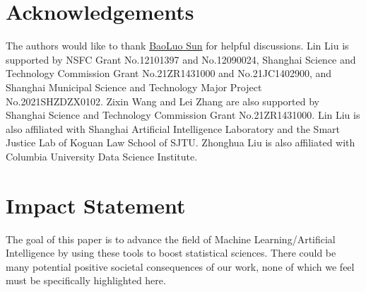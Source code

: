\documentclass{article}
\def\dnase{{\mathsf{DNA\mbox{-}SE}}}
\theoremstyle{plain}
\newtheorem{theorem}{Theorem}[section]
\theoremstyle{definition}
\theoremstyle{remark}
\def\hat{\widehat}
\begin{document}

\section*{Acknowledgements}
The authors would like to thank \href{https://sites.google.com/site/blsunnus/}{BaoLuo Sun} for helpful discussions. Lin Liu is supported by NSFC Grant No.12101397 and No.12090024, Shanghai Science and Technology Commission Grant No.21ZR1431000 and No.21JC1402900, and Shanghai Municipal Science and Technology Major Project No.2021SHZDZX0102. Zixin Wang and Lei Zhang are also supported by Shanghai Science and Technology Commission Grant No.21ZR1431000. Lin Liu is also affiliated with Shanghai Artificial Intelligence Laboratory and the Smart Justice Lab of Koguan Law School of SJTU. Zhonghua Liu is also affiliated with Columbia University Data Science Institute.

\section*{Impact Statement}

The goal of this paper is to advance the field of Machine Learning/Artificial Intelligence by using these tools to boost statistical sciences. There could be many potential positive societal consequences of our work, none of which we feel must be specifically highlighted here.
 




\newpage
\appendix
\onecolumn
\appendix

\end{document}
